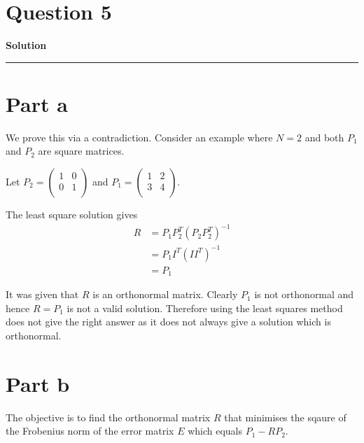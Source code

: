 \documentclass[a4paper,14pt]{article}
\title{\cooltitle{CS663 Assignment-5}}
\author{{\bf Saksham Rathi, Kavya Gupta, Shravan Srinivasa Raghavan} \\
\small Department of Computer Science, \\
Indian Institute of Technology Bombay \\}
\date{}
\newenvironment{solution}[2][]{%
    \begin{mdframed}[linecolor=blue!70!black, linewidth=2pt, roundcorner=10pt, backgroundcolor=yellow!10!white, skipabove=12pt, skipbelow=12pt]%
        \textbf{\large #2}
        \par\noindent\rule{\textwidth}{0.4pt}
}{
    \end{mdframed}
}
\begin{document}
\maketitle

\section*{Question 5}
\begin{solution}{Solution}
  
  \section{Part a}
    We prove this via a contradiction. Consider an example where $N = 2$ and both $P_{1}$ and $P_{2}$ are square matrices.
    
    Let 
    $P_{2} = \begin{pmatrix}
      1 & 0 \\
      0 & 1 \\
    \end{pmatrix}$ 
    and $P_{1} = \begin{pmatrix}
      1 & 2 \\
      3 & 4 \\
    \end{pmatrix}$. 

    The least square solution gives
    \begin{align*}
      R &= P_{1}P_{2}^{T}{(P_{2}P_{2}^{T})}^{-1} \\
        &= P_{1}I^{T} {(II^{T})}^{-1} \\
        &= P_{1}    
    \end{align*}

    It was given that $R$ is an orthonormal matrix. Clearly $P_{1}$ is not orthonormal and hence $R = P_{1}$ is not a valid 
    solution. Therefore using the least squares method does not give the right answer as it does not always give a solution 
    which is orthonormal. 
  \section{Part b}
    The objective is to find the orthonormal matrix $R$ that minimises the sqaure of the Frobenius norm of the error matrix $E$ which equals 
    $P_{1} - R P_{2}$. 
    

\end{solution}
\end{document}

